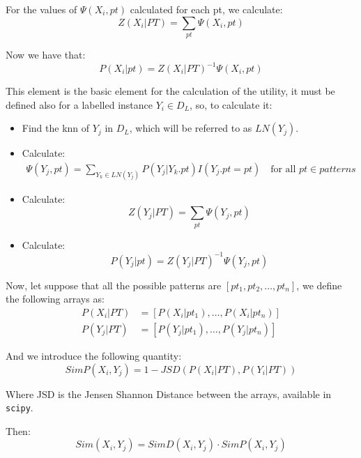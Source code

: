 For the values of $\Psi(X_i, pt)$ calculated for each pt, we calculate:
\begin{equation}
    Z(X_i|PT) = \sum_{pt} \Psi(X_i, pt)
\end{equation}

Now we have that:
\begin{equation}
    P(X_i | pt) = Z(X_i|PT)^{-1} \Psi(X_i, pt)
\end{equation}

This element is the basic element for the calculation of the utility, it must be
defined also for a labelled instance $Y_i \in D_L$, so, to calculate it:
\begin{itemize}
    \item Find the knn of $Y_j$ in $D_L$, which will be referred to as $LN(Y_j)$.
    \item Calculate:
    \begin{align}
        \Psi(Y_j, pt) = \sum_{Y_k \in LN(Y_j)} P(Y_j | Y_k.pt) I(Y_j.pt = pt)
        \, \, \, \, \, \, 
        \text{for all } pt \in patterns 
    \end{align}
    \item Calculate:
    \begin{equation}
        Z(Y_j | PT) = \sum_{pt} \Psi(Y_j, pt)
    \end{equation}
    \item Calculate:
    \begin{equation}
        P(Y_j | pt) = Z(Y_j |PT )^{-1} \Psi(Y_j, pt)
    \end{equation}
\end{itemize}

Now, let suppose that all the possible patterns are $[pt_1, pt_2, \dots, pt_n]$, 
we define the following arrays as:
\begin{align}
    P(X_i | PT) &= \left[ P(X_i | pt_1), \dots, P(X_i | pt_n) \right]\\
    P(Y_j | PT) &= \left[ P(Y_j | pt_1), \dots, P(Y_j | pt_n) \right] 
\end{align}

And we introduce the following quantity:
\begin{equation}
    SimP(X_i, Y_j) = 1 - JSD(P(X_i | PT), P(Y_i | PT))
\end{equation}

Where JSD is the Jensen Shannon Distance between the arrays, available 
in \texttt{scipy}.

Then:
\begin{equation}
    Sim(X_i, Y_j) = SimD(X_i, Y_j) \cdot SimP(X_i, Y_j)
\end{equation}

